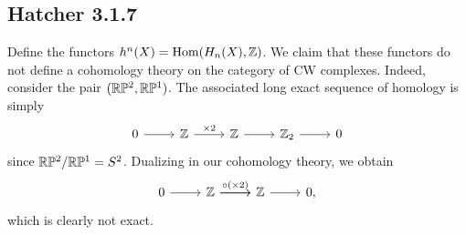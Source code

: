 \documentclass{../mathnotes}
\begin{document}
\subsection*{Hatcher 3.1.7}
Define the functors $h^n(X)=\operatorname{Hom}(H_n(X),\mathbb{Z})$. We claim that these functors do not
define a cohomology theory on the category of CW complexes. Indeed, consider the
pair $(\mathbb{R}\mathbb{P}^2,\mathbb{R}\mathbb{P}^1)$. The associated long exact sequence of homology is simply
\begin{equation*}
    \begin{tikzcd}
        0\ar{r} & \Z\ar{r}{\times 2} & \Z\ar{r} & \Z_2\ar{r} & 0
    \end{tikzcd}
\end{equation*}
since $\mathbb{R}\mathbb{P}^2/\mathbb{R}\mathbb{P}^1=S^2$. Dualizing in our cohomology theory, we obtain
\begin{equation*}
    \begin{tikzcd}
        0\ar{r} & \Z\ar{r}{\circ (\times 2)}\ar{r} & \Z\ar{r} & 0,
    \end{tikzcd}
\end{equation*}
which is clearly not exact.
\end{document}
